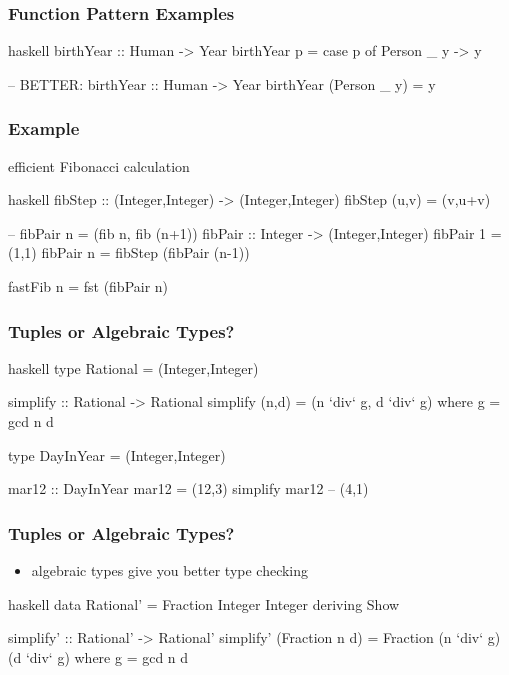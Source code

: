 \documentclass[dvipsnames]{beamer}
\theoremstyle{plain}
\begin{document}
\begin{frame}[fragile]
  \frametitle{Function Pattern Examples}

  \begin{exampleblock}{}
    \begin{pygments}{haskell}
birthYear :: Human -> Year
birthYear p =
    case p of
      Person _ y -> y

-- BETTER:
birthYear :: Human -> Year
birthYear (Person _ y) = y
    \end{pygments}
  \end{exampleblock}
\end{frame}

\begin{frame}[fragile]
  \frametitle{Example}

  \begin{exampleblock}{efficient Fibonacci calculation}
    \begin{pygments}{haskell}
fibStep :: (Integer,Integer) -> (Integer,Integer)
fibStep (u,v) = (v,u+v)

-- fibPair n = (fib n, fib (n+1))
fibPair :: Integer -> (Integer,Integer)
fibPair 1 = (1,1)
fibPair n = fibStep (fibPair (n-1))

fastFib n = fst (fibPair n)
    \end{pygments}
  \end{exampleblock}
\end{frame}

\begin{frame}[fragile]
  \frametitle{Tuples or Algebraic Types?}

  \begin{exampleblock}{}
    \begin{pygments}{haskell}
type Rational = (Integer,Integer)

simplify :: Rational -> Rational
simplify (n,d) = (n `div` g, d `div` g)
  where g = gcd n d

type DayInYear = (Integer,Integer)

mar12 :: DayInYear
mar12 = (12,3)
simplify mar12 -- (4,1)
    \end{pygments}
  \end{exampleblock}
\end{frame}

\begin{frame}[fragile]
  \frametitle{Tuples or Algebraic Types?}

  \begin{itemize}
    \item algebraic types give you better type checking
  \end{itemize}

  \begin{exampleblock}{}
    \begin{pygments}{haskell}
data Rational' = Fraction Integer Integer
                 deriving Show

simplify' :: Rational' -> Rational'
simplify' (Fraction n d) =
  Fraction (n `div` g) (d `div` g)
    where g = gcd n d
    \end{pygments}
  \end{exampleblock}
\end{frame}
\end{document}
